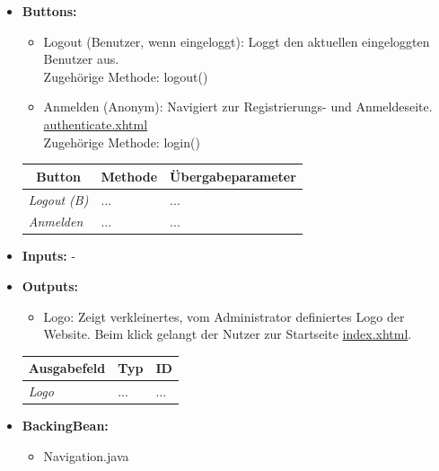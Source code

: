 \begin{itemize}
			\item \textbf{Buttons:}
				\begin{itemize}
					\item Logout (Benutzer, wenn eingeloggt): Loggt den aktuellen eingeloggten Benutzer aus. \\ Zugehörige Methode: logout()
					\item Anmelden (Anonym): Navigiert zur Registrierungs- und Anmeldeseite. \hyperlink{authenticate}{authenticate.xhtml} \\ Zugehörige Methode: login()
				\end{itemize}
				\begin{center}
					\begin{longtable}{|p{4cm} |p{4cm} | p{4cm}|}
					
						\hline \multicolumn{1}{|c|}{\textbf{Button}} & \multicolumn{1}{|c|}{\textbf{Methode}} & \multicolumn{1}{|c|}{\textbf{\"{U}bergabeparameter}} \\ \hline
						\endfirsthead
						\hline
						\endlastfoot
					
							\textit{Logout (B)} & ... & ... \\ \hline
							\textit{Anmelden} & ... & ... \\ \hline
					\end{longtable}
				\end{center}
			\item \textbf{Inputs:} -
			\item \textbf{Outputs:}
				\begin{itemize}
					\item Logo: Zeigt verkleinertes, vom Administrator definiertes Logo der Website. Beim klick gelangt der Nutzer zur Startseite \hyperlink{index}{index.xhtml}.
				\end{itemize}
				\begin{center}
					\begin{longtable}{|p{5cm} | p{4cm}|p{3cm}|}
						
						\hline \multicolumn{1}{|c|}{\textbf{Ausgabefeld}} & \multicolumn{1}{|c|}{\textbf{Typ}}  &  \multicolumn{1}{|c|}{\textbf{ID}} \\ \hline
						\endfirsthead
						\hline
						\endlastfoot
						\textit{Logo}  & ... & ... \\ \hline
					\end{longtable}
				\end{center}
			\item \textbf{BackingBean:}
				\begin{itemize}
					\item Navigation.java
				\end{itemize}
		\end{itemize}
		
